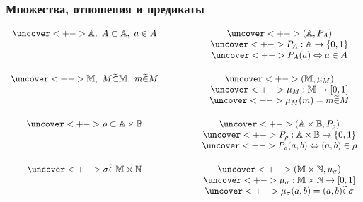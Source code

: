 \documentclass[24pt,pdf,hyperref={unicode}]{beamer}
\begin{document}
\begin{frame}\frametitle{Множества, отношения и предикаты}

$$
\begin{array}{c p{1cm} c}
\uncover<+->{\mathbb{A},\ A\subset \mathbb{A},\ a\in A}
&&
\uncover<+->{(\mathbb{A},P_A)} \\
&& 
\uncover<+->{P_A:\mathbb{A}\rightarrow\{0,1\}} \\
&& 
\uncover<+->{P_A(a)\Leftrightarrow a\in A}\\[0.5cm]
\uncover<+->{\mathbb{M},\ M\fsubset \mathbb{M},\ m\fin M}
&&
\uncover<+->{(\mathbb{M},\mu_M)} \\
&&
\uncover<+->{\mu_M:\mathbb{M}\rightarrow[0,1]}\\
&&
\uncover<+->{\mu_M(m)=m\fin M} \\[0.5cm]
\uncover<+->{\rho\subset\mathbb{A}\times\mathbb{B}}
&&
\uncover<+->{(\mathbb{A}\times\mathbb{B},P_\rho)} \\
&&
\uncover<+->{P_\rho:\mathbb{A}\times\mathbb{B}\rightarrow\{0,1\}}\\
&&
\uncover<+->{P_\rho(a,b)\Leftrightarrow (a,b)\in\rho} \\[0.5cm]
\uncover<+->{\sigma\fsubset\mathbb{M}\times\mathbb{N}}
&&
\uncover<+->{(\mathbb{M}\times\mathbb{N},\mu_\sigma)} \\
&&
\uncover<+->{\mu_\sigma:\mathbb{M}\times\mathbb{N}\rightarrow[0,1]}\\
&&
\uncover<+->{\mu_\sigma(a,b)=(a,b)\fin\sigma} \\[0.5cm]


\end{array}
$$
\end{frame}
\end{document}
